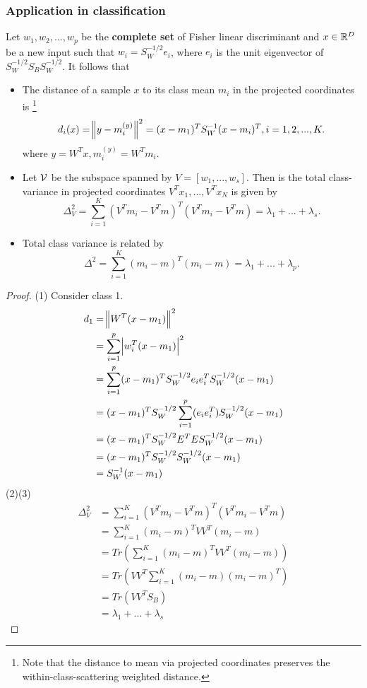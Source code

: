 \begin{refsection}
\subsubsection{Application in classification}
\begin{lemma}
	Let $w_1,w_2,...,w_p$ be the \textbf{complete set} of Fisher linear discriminant and $x\in\mathbb{R}^D$ be a new input such that $w_i = S_W^{-1/2}e_i$, where $e_i$ is the unit eigenvector of $S_W^{-1/2}S_BS_W^{-1/2}$.	It follows that
	\begin{itemize}
		\item The distance of a sample $x$ to its class mean $m_i$ in the projected coordinates is \footnote{Note that the distance to mean via projected coordinates preserves the within-class-scattering weighted distance.} 
		$$d_i(x) =  \norm{y - m_i^{(y)}}^2 = (x-m_1)^TS_W^{-1}(x-m_i)^T, i=1,2,...,K.$$
		where $y = W^Tx, m_i^{(y)} = W^Tm_i.$
		\item Let $\mathcal{V}$ be the subspace spanned by $V = [w_1,...,w_s]$. Then is the total class-variance in projected coordinates $V^Tx_1,...,V^Tx_N$ is given by
		$$\Delta^2_V = \sum_{i=1}^K (V^Tm_i - V^Tm)^T(V^Tm_i - V^Tm) = \lambda_1 + ... + \lambda_s.$$
		\item Total class variance is related by  
		$$\Delta^2 = \sum_{i=1}^K (m_i - m)^T(m_i - m) = \lambda_1 + ... + \lambda_p.$$
	\end{itemize}	
\end{lemma}
\begin{proof}
(1) 
	Consider class 1. 
	\begin{align*}
	d_1 &= \norm{W^T(x - m_1)}^2 \\
	&= \sum_{i=1}^p \abs{w_i^T(x-m_1)}^2 \\
	&= \sum_{i=1}^p(x-m_1)^TS_W^{-1/2}e_ie_i^TS_W^{-1/2}(x-m_1) \\
	&= (x-m_1)^TS_W^{-1/2}\sum_{i=1}^p(e_ie_i^T)S_W^{-1/2}(x-m_1) \\
	&= (x-m_1)^TS_W^{-1/2}E^TES_W^{-1/2}(x-m_1) \\
	&= (x-m_1)^TS_W^{-1/2}S_W^{-1/2}(x-m_1) \\
	&= S_W^{-1}(x-m_1) 
	\end{align*}
(2)(3)	
	\begin{align*}
\Delta^2_V &= \sum_{i=1}^K (V^Tm_i - V^Tm)^T(V^Tm_i - V^Tm) \\
&= \sum_{i=1}^K (m_i - m)^TVV^T(m_i - m) \\
&= Tr(\sum_{i=1}^K (m_i - m)^TVV^T(m_i - m)) \\
&= Tr(VV^T\sum_{i=1}^K (m_i - m)(m_i - m)^T) \\
&= Tr(VV^TS_B) \\
&= \lambda_1 + ... + \lambda_s
\end{align*}


\end{proof}
\end{refsection}
